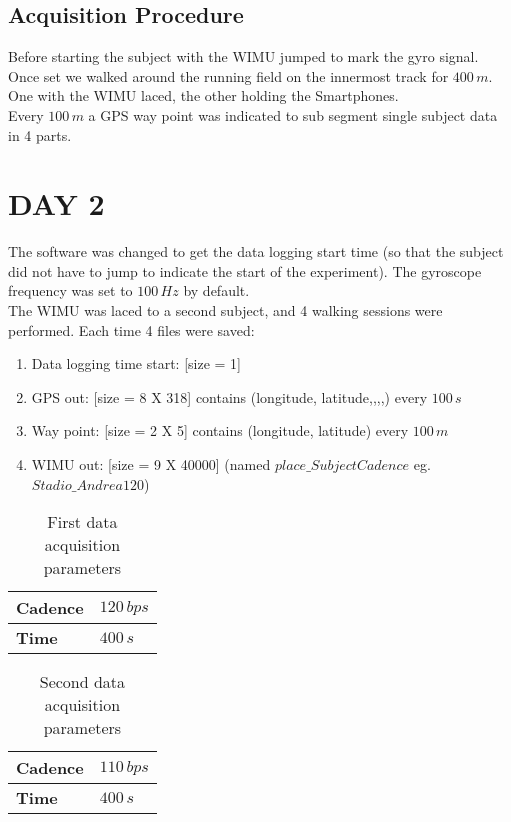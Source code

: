 \documentclass[a4paper,twoside,10pt]{report}
\begin{document}
\subsection{Acquisition Procedure}
Before starting the subject with the WIMU jumped to mark the gyro signal. 
Once set we walked around the running field on the innermost track for $400\,m$. One with the WIMU laced, the other holding the Smartphones.\\ 
Every $100\,m$ a GPS way point was indicated to sub segment single subject data in 4 parts. 

\section{DAY 2}
The software was changed to get the data logging start time (so that the subject did not have to jump to indicate the start of the experiment). The gyroscope frequency was set to $100\,Hz$ by default.\\
The WIMU was laced to a second subject, and 4 walking sessions were performed. Each time 4 files were saved: 

\begin{enumerate}
	\item Data logging time start: [size = 1] 
	\item GPS out: [size = 8 X 318] contains (longitude, latitude,,,,) every $100\,s$
	\item Way point: [size = 2 X 5] contains (longitude, latitude) every $100\,m$
	\item WIMU out: [size = 9 X 40000] (named $place\_SubjectCadence$ eg. $Stadio\_Andrea120$)
\end{enumerate}

\begin{table}[h]
	\centering
		\begin{tabular}{|l|l|}
		  \hline
			\textbf{Cadence} & $120\,bps$\\
			\hline
			\textbf{Time} & $400\,s$\\
			\hline
		\end{tabular}
	\caption{First data acquisition parameters}
	\label{tab:FirstDataAcquisitionParametersAndrea}
\end{table}

\begin{table}[h]
	\centering
		\begin{tabular}{|l|l|}
		  \hline
			\textbf{Cadence} & $110\,bps$\\
			\hline
			\textbf{Time} & $400\,s$\\
			\hline
		\end{tabular}
	\caption{Second data acquisition parameters}
	\label{tab:SecondDataAcquisitionParametersAndrea}
\end{table}
\end{document}
